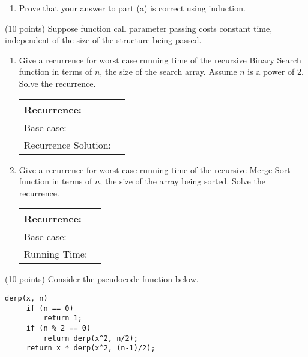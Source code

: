 \documentclass[11pt]{article}
\begin{document}
\begin{problems}
\begin{enumerate}
        \item Prove that your answer to part (a) is correct using induction.
            \vfill\vfill

\end{enumerate}

\newpage
\item (10 points)
    Suppose function call parameter passing costs constant time, independent of
    the size of the structure being passed.

    \begin{enumerate}
        \item Give a recurrence for worst case running time of the recursive
            Binary Search function in terms of $n$, the size of the search
            array. Assume $n$ is a power of 2. Solve the recurrence.

            \vfill\vfill

            \hfill
            \begin{tabular}{|l|c|}
                \hline
                Recurrence: & \hspace{2in} \\ \hline
                Base case: & \\ \hline
                Recurrence Solution: &  \\ \hline
            \end{tabular}
            \vfill

        \item Give a recurrence for worst case running time of the recursive
            Merge Sort function in terms of $n$, the size of the array being
            sorted. Solve the recurrence.

            \vfill\vfill

            \hfill
            \begin{tabular}{|l|c|}
                \hline
                Recurrence: & \hspace{2in} \\ \hline
                Base case: & \\ \hline
                Running Time: &  \\ \hline
            \end{tabular}
            \vfill

    \end{enumerate}


\newpage
\item (10 points)
    Consider the pseudocode function below.
\begin{verbatim}
derp(x, n)
     if (n == 0)
         return 1;
     if (n % 2 == 0)
         return derp(x^2, n/2);
     return x * derp(x^2, (n-1)/2);
\end{verbatim}


\end{problems}
\end{document}
